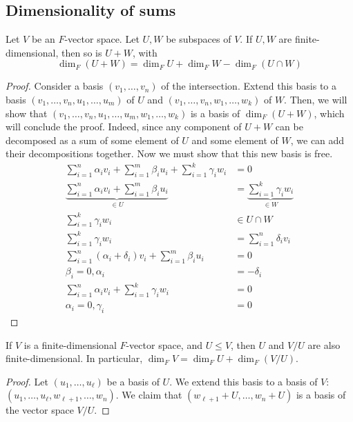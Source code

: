 \subsection{Dimensionality of sums}
\begin{proposition}
	Let \( V \) be an \( F \)-vector space.
	Let \( U, W \) be subspaces of \( V \).
	If \( U, W \) are finite-dimensional, then so is \( U + W \), with
	\[
		\dim_F (U + W) = \dim_F U + \dim_F W - \dim_F (U \cap W)
	\]
\end{proposition}
\begin{proof}
	Consider a basis \( (v_1, \dots, v_n) \) of the intersection.
	Extend this basis to a basis \( (v_1, \dots, v_n, u_1, \dots, u_m) \) of \( U \) and \( (v_1, \dots, v_n, w_1, \dots, w_k) \) of \( W \).
	Then, we will show that \( (v_1, \dots, v_n, u_1, \dots, u_m, w_1, \dots, w_k) \) is a basis of \( \dim_F (U + W) \), which will conclude the proof.
	Indeed, since any component of \( U + W \) can be decomposed as a sum of some element of \( U \) and some element of \( W \), we can add their decompositions together.
	Now we must show that this new basis is free.
	\begin{align*}
		\sum_{i=1}^n \alpha_i v_i + \sum_{i=1}^m \beta_i u_i + \sum_{i=1}^k \gamma_i w_i & = 0                                              \\
		\underbrace{\sum_{i=1}^n \alpha_i v_i + \sum_{i=1}^m \beta_i u_i}_{\in U}        & = \underbrace{\sum_{i=1}^k \gamma_i w_i}_{\in W} \\
		\sum_{i=1}^k \gamma_i w_i                                                        & \in U \cap W                                     \\
		\sum_{i=1}^k \gamma_i w_i                                                        & = \sum_{i=1}^n \delta_i v_i                      \\
		\sum_{i=1}^n (\alpha_i + \delta_i) v_i + \sum_{i=1}^m \beta_i u_i                & = 0                                              \\
		\beta_i = 0, \alpha_i                                                            & = -\delta_i                                      \\
		\sum_{i=1}^n \alpha_i v_i + \sum_{i=1}^k \gamma_i w_i                            & = 0                                              \\
		\alpha_i = 0, \gamma_i                                                           & = 0
	\end{align*}
\end{proof}
\begin{proposition}
	If \( V \) is a finite-dimensional \( F \)-vector space, and \( U \leq V \), then \( U \) and \( V / U \) are also finite-dimensional.
	In particular, \( \dim_F V = \dim_F U + \dim_F (V / U) \).
\end{proposition}
\begin{proof}
	Let \( (u_1, \dots, u_\ell) \) be a basis of \( U \).
	We extend this basis to a basis of \( V \): \( (u_1, \dots, u_\ell, w_{\ell + 1}, \dots, w_n) \).
	We claim that \( (w_{\ell + 1} + U, \dots, w_n + U) \) is a basis of the vector space \( V / U \).
\end{proof}

